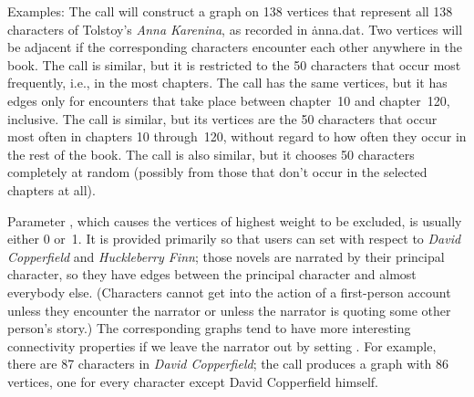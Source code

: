 Examples: The call  will construct a
graph on 138 vertices that represent all 138 characters of Tolstoy's
{\sl Anna Karenina\/}, as recorded in \.{anna.dat}. Two vertices will
be adjacent if the corresponding characters
encounter each other anywhere in the book. The call
 is
similar, but it is restricted to
the 50 characters that occur most frequently, i.e., in the most chapters.
The call  has the same vertices, but it
has edges only for encounters that take place between chapter~10
and chapter~120, inclusive. The call  is
similar, but its vertices are the 50 characters that occur most often in
chapters 10 through~120, without regard to how often they occur in
the rest of the book. The call  is
also similar, but it chooses 50 characters completely at random
(possibly from those that don't occur in the selected chapters at all).

Parameter , which causes the  vertices of highest weight to be
excluded, is usually either 0 or~1. It is provided primarily so that
users can set  with respect to {\sl David Copperfield\/} and {%
\sl
Huckleberry Finn}; those novels are narrated by their principal
character, so they have edges between the principal character and
almost everybody else. (Characters cannot get into the action of a
first-person account unless they encounter the narrator or unless the
narrator is quoting some other person's story.) The corresponding
graphs tend to have more interesting connectivity properties if we
leave the narrator out by setting . For example, there are 87
characters in {\sl David Copperfield\/}; the call
 produces
a graph with 86 vertices, one
for every character except David Copperfield himself.

\fi

